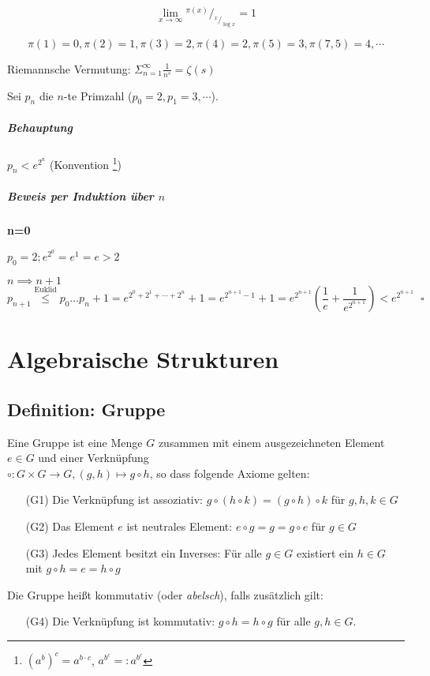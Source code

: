 \documentclass[14pt,a4paper]{article}
\newcommand*\rfrac[2]{{}^{#1}\!/_{#2}}
\begin{document}
  $$ \lim_{x \to \infty} \rfrac{\pi(x)}{\rfrac{x}{\log x}} = 1$$

  $$ \pi(1) = 0, \pi(2) = 1, \pi(3)=2, \pi(4) = 2, \pi(5)=3, \pi(7,5)=4,
  \dotsb $$

  Riemannsche Vermutung: $ \Sigma_{n=1}^{\infty} \frac{1}{n^s} = \zeta(s) $

  Sei $p_n$ die $n$-te Primzahl ($p_0 = 2, p_1=3, \dotsb $).
  \subparagraph{Behauptung}
  $ p_n < e^{2^n} $ (Konvention \footnote{$ (a^b)^c = a^{b \cdot c} $, $ a^{b^c}
    =: a^{b^c}$})

  \subparagraph{Beweis per Induktion über $n$}\par
  \textbf{n=0}\par
  $p_0 = 2; e^{2^0} = e^1 = e > 2$\par
  \textbf{$n \implies n+1$}
  $$p_{n+1} \stackrel{\text{Euklid}}{\leq} p_0 \dots p_n + 1 = e^{2^0 + 2^1 +
    \dotsb + 2^n} + 1 = e^{2^{n+1}-1}+1 = e^{2^{n+1}}(\frac{1}{e} +
  \frac{1}{e^{2^{n+1}}}) < e^{2^{n+1}} \;\; \square$$

  \section{Algebraische Strukturen}
  \subsection{Definition: Gruppe}
  Eine Gruppe ist eine Menge $G$ zusammen mit einem ausgezeichneten Element $e
  \in G$ und einer Verknüpfung \\ $ \circ : G \times G \to G, (g,h) \mapsto g \circ
  h$, so dass folgende Axiome gelten:

  \begin{enumerate}
    \item[(G1)] Die Verknüpfung ist assoziativ: $ g \circ ( h \circ k ) = (g \circ
      h) \circ k$ für $g,h,k \in G$
    \item[(G2)] Das Element $e$ ist neutrales Element: $ e \circ g = g = g \circ
      e$ für $g \in G$
    \item[(G3)] Jedes Element besitzt ein Inverses: Für alle $ g\in G$ existiert
      ein $h \in G$ mit $g \circ h = e = h \circ g$
  \end{enumerate}

  Die Gruppe heißt kommutativ (oder \textit{abelsch}), falls zusätzlich gilt:
  \begin{enumerate}
    \item[(G4)] Die Verknüpfung ist kommutativ: $g \circ h = h \circ g$ für alle
      $g,h \in G$.
  \end{enumerate}
\end{document}

